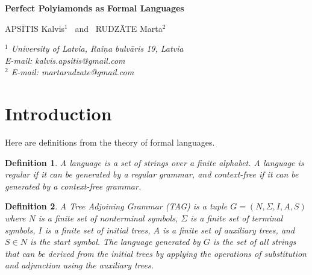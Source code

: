 \documentclass[a4paper,12pt]{article}
\newtheorem{definition}{\bf Definition}[section]
\begin{document}
\begin{center}
	 {\bf \large Perfect Polyiamonds as Formal Languages}
\end{center}

\vspace{0.1cm}

\begin{center}\large {
APSĪTIS Kalvis$^1$
\  and  \
RUDZĀTE Marta$^2$}
\end{center}
\begin{center}
\it {
$^1$ University of Latvia, 
Raiņa bulvāris 19, 
Latvia \\
E-mail: {\rm kalvis.apsitis@gmail.com} \\
\vspace{1mm}
$^2$ %
E-mail: {\rm martarudzate@gmail.com }}
\end{center}
\vspace{0.2cm}

\begin{abstract}
This presentation introduces Polyiamonds, Magic and Perfect Polyiamonds
as well as some narrower classes of perfect polyiamonds, and 
provides inductive definitions of infinite families of perfect polyiamonds
to establish the necessary and sufficient conditions for their existence.
The inductive definitions are expressed in the form of formal grammars. 

Several formalisms are considered, including Regular Grammars,
Context-Free Grammars (CFGs) and TAG (Tree-Adjoining Grammars), 
and Parallel Context-Free Grammars (PCLs).
\end{abstract}


\section{Introduction}

Here are definitions from the theory of formal languages. 

\begin{definition}
A {\em language} is a set of strings over a finite alphabet.
A language is {\em regular} if it can be generated by a regular grammar,
and {\em context-free} if it can be generated by a context-free grammar. 
\end{definition}

\begin{definition}
A {\em Tree Adjoining Grammar (TAG)}\cite{Joshi1997} is a tuple $G = (N, \Sigma, I, A, S)$ where $N$ is a finite set of nonterminal symbols, $\Sigma$ is a finite set of terminal symbols, $I$ is a finite set of initial trees, $A$ is a finite set of auxiliary trees, and $S \in N$ is the start symbol.
The language generated by $G$ is the set of all strings that can be derived from the
initial trees by applying the operations of substitution and adjunction using 
the auxiliary trees.
\end{definition}
\end{document}
